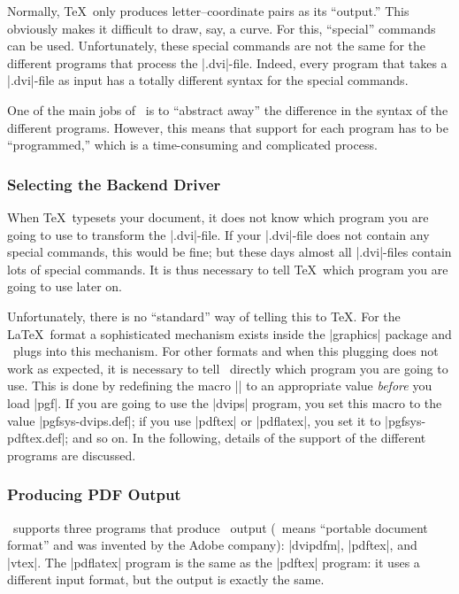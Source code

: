 Normally, \TeX\ only produces letter--coordinate pairs as its
``output.'' This obviously makes it difficult to draw, say, a
curve. For this, ``special'' commands can be used. Unfortunately,
these special commands are not the same for the different programs
that process the |.dvi|-file. Indeed, every program that takes a
|.dvi|-file as input has a totally different syntax for the special
commands.

One of the main jobs of \pgfname\ is to ``abstract away'' the
difference in the syntax of the different programs. However, this
means that support for each program has to be ``programmed,'' which is
a time-consuming and complicated process.


\subsubsection{Selecting the Backend Driver}

When \TeX\ typesets your document, it does not know which program
you are going to use to transform the |.dvi|-file. If your |.dvi|-file
does not contain any special commands, this would be fine; but these
days almost all |.dvi|-files contain lots of special commands. It is
thus necessary to tell \TeX\ which program you are going to use later
on.

Unfortunately, there is no ``standard'' way of telling this to
\TeX. For the \LaTeX\ format a sophisticated mechanism exists inside
the |graphics| package and \pgfname\ plugs into this mechanism. For
other formats and when this plugging does not work as expected, it is
necessary to tell \pgfname\ directly which program you are going to
use. This is done by redefining the macro |\pgfsysdriver| to an
appropriate value \emph{before} you load |pgf|. If you are going to
use the |dvips| program, you set this macro to the value
|pgfsys-dvips.def|; if you use |pdftex| or |pdflatex|, you set it to
|pgfsys-pdftex.def|; and so on. In the following, details of the
support of the different programs are discussed.


\subsubsection{Producing PDF Output}

\pgfname\ supports three programs that produce \pdf\ output (\pdf\ means
``portable document format'' and was invented by the Adobe company):
|dvipdfm|, |pdftex|, and |vtex|. The |pdflatex| program is the same as the
|pdftex| program: it uses a different input format, but the output is
exactly the same.

